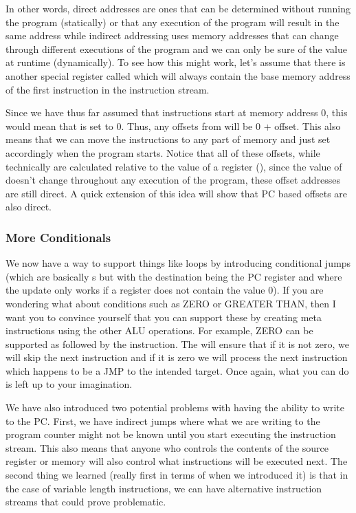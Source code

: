 In other words, direct addresses are ones that can be determined without running the program (statically) or that any execution of the program will result in the same address while indirect addressing uses memory addresses that can change through different executions of the program and we can only be sure of the value at runtime (dynamically). To see how this might work, let’s assume that there is another special register called  which will always contain the base memory address of the first instruction in the instruction stream. 

Since we have thus far assumed that instructions start at memory address 0, this would mean that  is set to 0. Thus, any offsets from  will be 0 + offset. This also means that we can move the instructions to any part of memory and just set  accordingly when the program starts. Notice that all of these offsets, while technically are calculated relative to the value of a register (), since the value of  doesn’t change throughout any execution of the program, these offset addresses are still direct. A quick extension of this idea will show that PC based offsets are also direct.

\subsubsection{More Conditionals}

We now have a way to support things like loops by introducing conditional jumps (which are basically s but with the destination being the PC register and where the update only works if a register does not contain the value 0). If you are wondering what about conditions such as ZERO or GREATER THAN, then I want you to convince yourself that you can support these by creating meta instructions using the other ALU operations. For example, ZERO can be supported as  followed by the  instruction.  The  will ensure that if it is not zero, we will skip the next instruction and if it is zero we will process the next instruction which happens to be a JMP to the intended target. Once again, what you can do is left up to your imagination.

We have also introduced two potential problems with having the ability to write to the PC. First, we have indirect jumps where what we are writing to the program counter might not be known until you start executing the instruction stream. This also means that anyone who controls the contents of the source register or memory will also control what instructions will be executed next. The second thing we learned (really first in terms of when we introduced it) is that in the case of variable length instructions, we can have alternative instruction streams that could prove problematic. 

